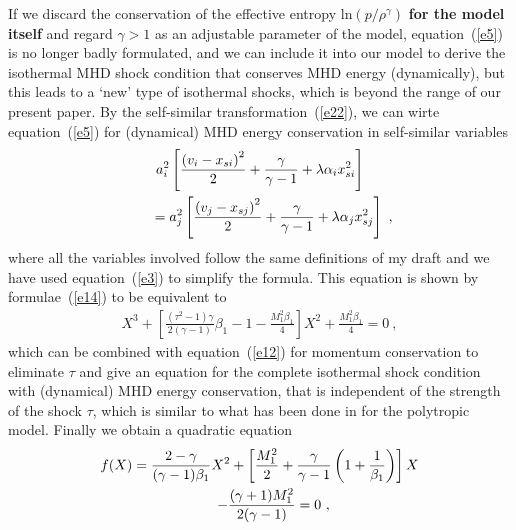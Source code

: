 \documentclass[fleqn,usenatbib]{mnras}
\begin{document}
If we discard the conservation of the effective entropy $\mathrm{ln}\left(p/\rho^{\gamma}\right)$ \textbf{for the model itself} and regard $\gamma>1$ as an adjustable parameter of the model, equation~(\ref{e5}) is no longer badly formulated, and we can include it into our model to derive the isothermal MHD shock condition that conserves MHD energy (dynamically), but this leads to a `new' type of isothermal shocks, which is beyond the range of our present paper.
By the self-similar transformation~(\ref{e22}), we can wirte equation~(\ref{e5}) for (dynamical) MHD energy conservation in self-similar variables
\begin{gather}
a_{i}^{2}\left[\frac{\left(v_{i}-x_{si}\right)^{2}}{2}+\frac{\gamma}{\gamma-1}+\lambda\alpha_{i}x_{si}^{2}\right]\notag\\
\qquad =a_{j}^{2}\left[\frac{\left(v_{j}-x_{sj}\right)^{2}}{2}+\frac{\gamma}{\gamma-1}+\lambda\alpha_{j}x_{sj}^{2}\right]\ ,\label{e23}
\end{gather}
where all the variables involved follow the same definitions of my draft and we have used equation~(\ref{e3}) to simplify the formula. This equation is shown by formulae~(\ref{e14}) to be equivalent to
\begin{gather}
X^{3}+\left[\frac{\left(\tau^{2}-1\right)\gamma}{2(\gamma-1)}\beta_{1}-1-\frac{M_{1}^{2}\beta_{1}}{4}\right]X^{2}+\frac{M_{1}^{2}\beta_{1}}{4}=0\ ,\label{e24}
\end{gather}
which can be combined with equation~(\ref{e12}) for momentum conservation to eliminate $\tau$ and give an equation for the complete isothermal shock condition with (dynamical) MHD energy conservation, that is independent of the strength of the shock $\tau$, which is similar to what has been done in \citet{wang2008dynamic} for the polytropic model. Finally we obtain a quadratic equation
\begin{gather}
f(X)=\frac{2-\gamma}{(\gamma-1)\beta_{1}}X^{2}+\left[\frac{M_{1}^{2}}{2}+\frac{\gamma}{\gamma-1}\left(1+\frac{1}{\beta_{1}}\right)\right]X\notag\\
\qquad -\frac{(\gamma+1)M_{1}^{2}}{2(\gamma-1)}=0\ ,\label{e25}
\end{gather}
\end{document}
